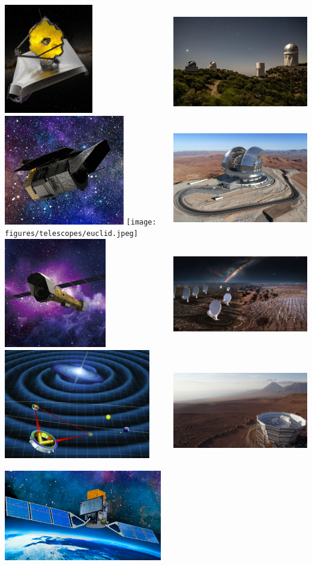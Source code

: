 \documentclass[aspectratio=169]{beamer}
\begin{document}
\begin{frame}
\begin{columns}
        \includegraphics[height=0.145\textwidth]{figures/telescopes/jwst.png}%
        \includegraphics[height=0.145\textwidth]{figures/telescopes/roman.jpg}%
        \texttt{[image: figures/telescopes/euclid.jpeg]}%
        \includegraphics[height=0.145\textwidth]{figures/telescopes/athena.jpg}%
        \includegraphics[height=0.145\textwidth]{figures/telescopes/lisa.jpg}%
        \includegraphics[height=0.145\textwidth]{figures/telescopes/e-ASTROGAM.pdf}%
        \vspace{-1pt}

        \includegraphics[height=0.15183\textwidth]{figures/telescopes/desi.jpg}%
        \includegraphics[height=0.15183\textwidth]{figures/telescopes/eelt.jpg}%
        \includegraphics[height=0.15183\textwidth]{figures/telescopes/ska.jpg}%
        \includegraphics[height=0.15183\textwidth]{figures/telescopes/SO.jpg}%
        \vspace{-1pt}


\end{columns}
\end{frame}
\end{document}
